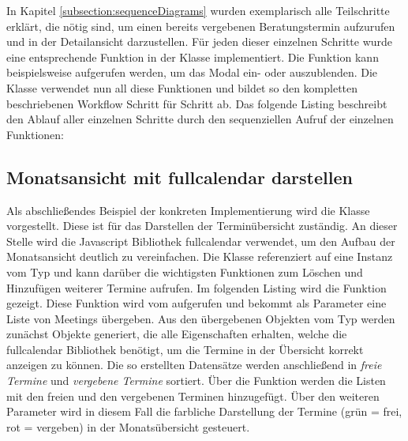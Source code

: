 In Kapitel \ref{subsection:sequenceDiagrams} wurden exemplarisch alle
Teilschritte erklärt, die nötig sind, um einen bereits vergebenen
Beratungstermin aufzurufen und in der Detailansicht darzustellen. Für jeden
dieser einzelnen Schritte wurde eine entsprechende Funktion in der Klasse
 implementiert. Die Funktion
 kann beispielsweise aufgerufen werden, um das
Modal ein- oder auszublenden. Die Klasse  verwendet
nun all diese Funktionen und bildet so den kompletten beschriebenen Workflow
Schritt für Schritt ab. Das folgende Listing beschreibt den Ablauf aller
einzelnen Schritte durch den sequenziellen Aufruf der einzelnen Funktionen:






\subsection*{Monatsansicht mit fullcalendar darstellen}

Als abschließendes Beispiel der konkreten Implementierung wird die Klasse
 vorgestellt. Diese ist für das Darstellen der
Terminübersicht zuständig. An dieser Stelle wird die Javascript Bibliothek
\gls{fullcalendar} verwendet, um den Aufbau der Monatsansicht deutlich zu vereinfachen. Die Klasse 
referenziert auf eine Instanz vom Typ  und kann darüber die
wichtigsten Funktionen zum Löschen und Hinzufügen weiterer Termine aufrufen. Im
folgenden Listing wird die Funktion  gezeigt.
Diese Funktion wird vom  aufgerufen und bekommt als
Parameter eine Liste von Meetings übergeben. Aus den übergebenen Objekten vom
Typ  werden zunächst Objekte generiert, die alle Eigenschaften
erhalten, welche die fullcalendar Bibliothek benötigt, um die Termine
in der Übersicht korrekt anzeigen zu können. Die so erstellten Datensätze
werden anschließend in \textit{freie Termine} und \textit{vergebene Termine}
sortiert. Über die Funktion 
werden die Listen mit den freien und den vergebenen Terminen hinzugefügt. Über
den weiteren Parameter  wird in diesem Fall die farbliche
Darstellung der Termine (grün = frei, rot = vergeben) in der Monatsübersicht gesteuert.

